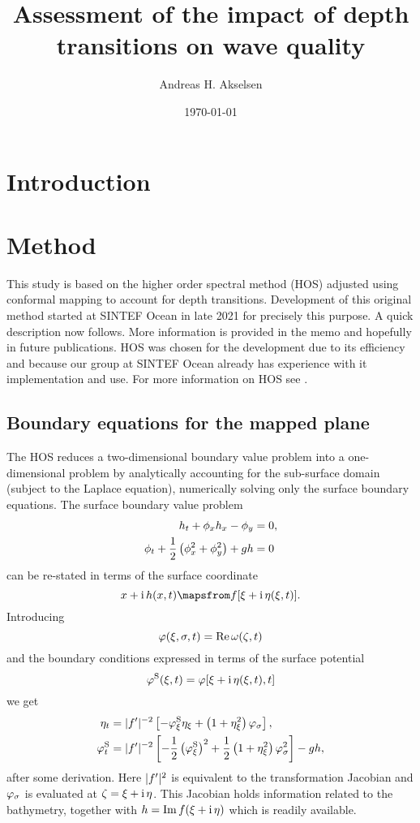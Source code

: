 \documentclass[internal]{sintefmemo}
\title{Assessment of the impact of depth transitions on wave quality}
\author{Andreas H. Akselsen}
\date{\today}
\begin{document}
\frontmatter
\tableofcontents

\section{Introduction}


\section{Method}
\label{sec:method}


This study is based on the higher order spectral method (HOS) adjusted using conformal mapping to account for depth transitions. 
Development of this original method started at SINTEF Ocean in late 2021 for precisely this purpose.
A quick description now follows. 
More information is provided in the memo \citet{AHA_2021_conformalHOS} and hopefully in future publications.
HOS was chosen for the development due to its efficiency and because our group at SINTEF Ocean already has experience with it implementation and use. 
For more information on HOS see \citet{SFo2018_HOS,bonnefoy2010,bonnefoy2006A_BM,ducrozet2006_BM}.


\subsection{Boundary equations for the mapped plane}
The HOS reduces a two-dimensional boundary value problem into a one-dimensional problem by analytically accounting for the sub-surface domain (subject to the Laplace equation), numerically solving only the surface boundary equations.
The surface boundary value problem 
\begin{align*}
h_t + \phi_x h_x-\phi_y&=0,\\
\phi_t + \frac12\left(\phi_x^2+\phi_y^2\right)+gh&=0
\end{align*}
can be re-stated in terms of the surface coordinate
\[
\x+\ii h(\x,t) \mapsfrom f[\xx+\ii \eta(\xx,t)].
\]
Introducing
\[\varphi(\xi,\sigma,t)=\operatorname{Re}\omega(\zeta,t) \]
and the boundary conditions expressed in terms of the surface potential 
\[
\varphi^\mathrm{S}(\xi,t)=\varphi[\xi+\mathrm{i}\,\eta(\xi,t),t]
\]
we get 
\begin{subequations}
\begin{align}
\eta_t &= |f'|^{-2} \left[-   \varphi^\mathrm{S}_\xi\eta_\xi + \left(1+\eta_\xi^2\right) \varphi_\sigma\right],\\
\varphi^\mathrm{S}_t  &= |f'|^{-2}\left[ - \frac12  \left(\varphi^\mathrm{S}_\xi\right)^2 + \frac12 \left(1+\eta_\xi^2\right) \varphi_\sigma^2 \right]  - g h,
\end{align}%
\end{subequations}%
after some derivation.
Here $|f'|^{2}$ is equivalent to the transformation Jacobian and $\varphi_\sigma$ is evaluated at $\zeta=\xi+\mathrm{i}\,\eta$.
This Jacobian holds information related to the bathymetry, together with 
$h=\operatorname{Im} f(\xi+\mathrm{i}\,\eta)$ which is readily available. 
\end{document}
